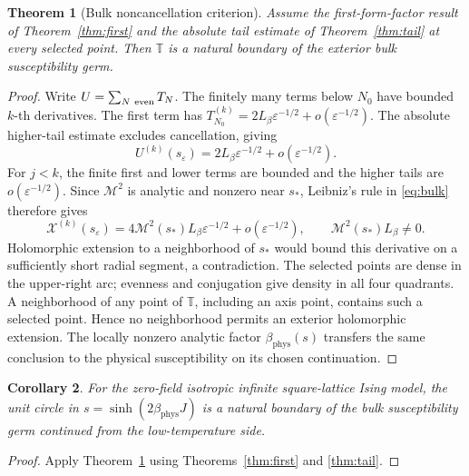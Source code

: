 \documentclass[11pt]{article}
\numberwithin{equation}{section}
\newtheorem{theorem}{Theorem}[section]
\newtheorem{corollary}[theorem]{Corollary}
\theoremstyle{definition}
\newcommand{\T}{\mathbb T}
\newcommand{\eps}{\varepsilon}
\newcommand{\M}{\mathcal M}
\newcommand{\sstar}{s_*}
\newcommand{\se}{s_\varepsilon}
\begin{document}
\begin{theorem}[Bulk noncancellation criterion]\label{thm:conditional}
Assume the first-form-factor result of Theorem~\ref{thm:first} and
the absolute tail estimate of Theorem~\ref{thm:tail} at every
selected point. Then \(\T\) is a natural boundary of the exterior
bulk susceptibility germ.
\end{theorem}
\begin{proof}
Write \(U=\sum_{N\ {\rm even}}T_N\).
The finitely many terms below \(N_0\) have bounded \(k\)-th derivatives.
The first term has
\(T_{N_0}^{(k)}=2L_\beta\eps^{-1/2}+o(\eps^{-1/2})\).
The absolute higher-tail estimate excludes cancellation, giving
\[
 U^{(k)}(\se)=2L_\beta\eps^{-1/2}+o(\eps^{-1/2}).
\]
For \(j<k\), the finite first and lower terms are bounded and the
higher tails are \(o(\eps^{-1/2})\). Since \(\M^2\) is analytic and
nonzero near \(\sstar\), Leibniz's rule in \eqref{eq:bulk} therefore gives
\[
 \mathcal X^{(k)}(\se)
 =4\M^2(\sstar)L_\beta\eps^{-1/2}+o(\eps^{-1/2}),
 \qquad \M^2(\sstar)L_\beta\ne0.
\]
Holomorphic extension to a neighborhood of \(\sstar\) would bound this
derivative on a sufficiently short radial segment, a contradiction.
The selected points are dense in the upper-right arc; evenness and
conjugation give density in all four quadrants. A neighborhood of
any point of \(\T\), including an axis point, contains such a selected
point. Hence no neighborhood permits an exterior holomorphic extension.
The locally nonzero analytic factor \(\beta_{\mathrm{phys}}(s)\) transfers the same
conclusion to the physical susceptibility on its chosen continuation.
\end{proof}

\begin{corollary}\label{thm:nb}
For the zero-field isotropic infinite square-lattice Ising model, the
unit circle in \(s=\sinh(2\beta_{\mathrm{phys}} J)\) is a natural boundary of the bulk
susceptibility germ continued from the low-temperature side.
\end{corollary}
\begin{proof}
Apply Theorem~\ref{thm:conditional} using Theorems~\ref{thm:first}
and \ref{thm:tail}.
\end{proof}
\end{document}
